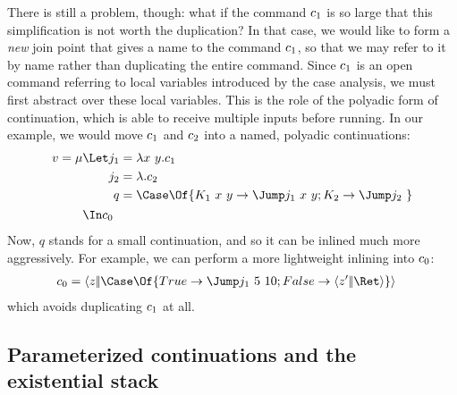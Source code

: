 \documentclass{article}
\begin{document}
There is still a problem, though: what if the command $c_1$ is so large that
this simplification is not worth the duplication?  In that case, we would like
to form a \emph{new} join point that gives a name to the command $c_1$, so
that we may refer to it by name rather than duplicating the entire command.
Since $c_1$ is an open command referring to local variables introduced by the
case analysis, we must first abstract over these local variables.  This is the
role of the polyadic form of continuation, which is able to receive multiple
inputs before running.  In our example, we would move $c_1$ and $c_2$ into
a named, polyadic continuations:
\begin{gather*}
v = \comp{r}
\begin{aligned}[t]
  &
  \Let
  \begin{aligned}[t]
    j_1 &= \fnk{x ~ y} \cmd_1
    \\
    j_2 &= \fnk{} \cmd_2
    \\
    q &= \Case\Of \{
    K_1 ~ x ~ y \to \jump{x ~ y}{j_1};
    K_2 \to \jump{}{j_2}
    \} 
  \end{aligned}
  \\
  &
  \In \cmd_0
\end{aligned}
\end{gather*}
Now, $q$ stands for a small continuation, and so it can be inlined much more
aggressively.  For example, we can perform a more lightweight inlining into
$c_0$:
\begin{align*}
  \cmd_0
  &=
  \cut{z}{\Case\Of \{ True \to \jump{5 ~ 10}{j_1}; False \to \cut{z'}{\ret q} \}}
\end{align*}
which avoids duplicating $c_1$ at all.

\subsection{Parameterized continuations and the existential stack}
\end{document}
